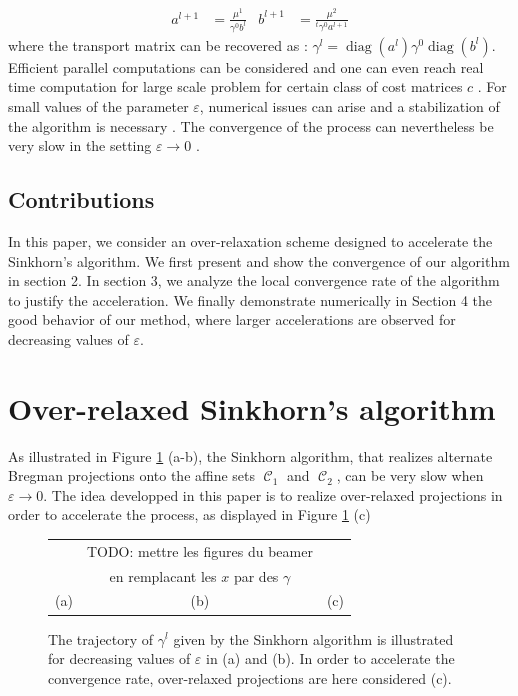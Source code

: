 \documentclass{article} %
\DeclareMathOperator{\Ccal}{\mathcal{C}}
\DeclareMathOperator{\diag}{diag}
\renewcommand{\epsilon}{\varepsilon}
\theoremstyle{plain}
\theoremstyle{definition}
\theoremstyle{remark}
\begin{document}
\begin{align*}
a^{l+1} &= \frac{\mu^1}{\gamma^0 b^l} &
b^{l+1} &= \frac{\mu^2}{^t \gamma^0 a^{l+1}} 
\end{align*}
where the transport matrix can be recovered as :
$\gamma^l = \diag(a^l) \gamma^0 \diag(b^l).$ 
Efficient parallel computations can be considered \cite{cuturi13} and one can even reach real time computation for large scale problem for certain class of cost matrices $c$ \cite{Solomon2015}. 
For small values of the parameter $\epsilon$, numerical issues can arise and a stabilization of the algorithm is necessary \cite{2016arXiv160705816C}.
The convergence of the process can nevertheless be very slow  in the setting $\epsilon\to 0$ .
\subsection{Contributions}
In this paper, we consider an over-relaxation scheme  designed to accelerate  the Sinkhorn's algorithm. We first present and show the convergence of our algorithm in section 2. In section 3, we analyze the local convergence rate of the algorithm to justify the acceleration.
We finally demonstrate numerically  in Section 4 the good behavior of our method, where larger accelerations are observed for decreasing values of $\epsilon$.



\section{Over-relaxed Sinkhorn's algorithm}

As illustrated in Figure \ref{alternate_projections} (a-b), the Sinkhorn algorithm, that  realizes alternate Bregman projections onto the affine sets $\Ccal_1$ and $\Ccal_2$, can be very slow when $\epsilon\to 0$. The idea developped in this paper is to realize over-relaxed projections in order to accelerate the process, as displayed in Figure \ref{alternate_projections} (c) 

\begin{figure}[ht!]
\begin{center}
\begin{tabular}{ccc}
&TODO: mettre les figures du beamer\\
&en remplacant les $x$ par des $\gamma$\\
(a)&(b)&(c)
\end{tabular}
\caption{\label{alternate_projections} The trajectory of $\gamma^l$ given by the Sinkhorn algorithm is illustrated for decreasing values of $\epsilon$ in (a) and (b). In order to accelerate the convergence rate, over-relaxed projections are here considered (c).}
\end{center}
\end{figure}
\end{document}
